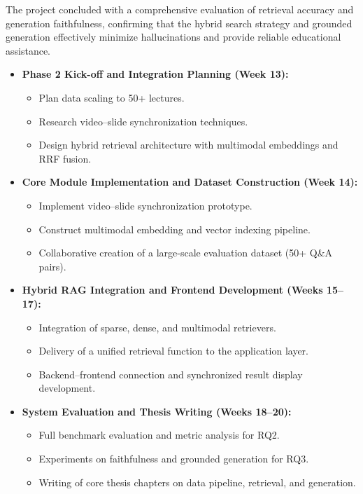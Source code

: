 The project concluded with a comprehensive evaluation of retrieval accuracy and generation faithfulness, confirming that the hybrid search strategy and grounded generation effectively minimize hallucinations and provide reliable educational assistance.

\begin{itemize}
    \item \textbf{Phase 2 Kick-off and Integration Planning (Week 13):}
    \begin{itemize}
        \item Plan data scaling to 50+ lectures.
        \item Research video--slide synchronization techniques.
        \item Design hybrid retrieval architecture with multimodal embeddings and RRF fusion.
    \end{itemize}

    \item \textbf{Core Module Implementation and Dataset Construction (Week 14):}
    \begin{itemize}
        \item Implement video--slide synchronization prototype.
        \item Construct multimodal embedding and vector indexing pipeline.
        \item Collaborative creation of a large-scale evaluation dataset (50+ Q\&A pairs).
    \end{itemize}

    \item \textbf{Hybrid RAG Integration and Frontend Development (Weeks 15--17):}
    \begin{itemize}
        \item Integration of sparse, dense, and multimodal retrievers.
        \item Delivery of a unified retrieval function to the application layer.
        \item Backend--frontend connection and synchronized result display development.
    \end{itemize}

    \item \textbf{System Evaluation and Thesis Writing (Weeks 18--20):}
    \begin{itemize}
        \item Full benchmark evaluation and metric analysis for RQ2.
        \item Experiments on faithfulness and grounded generation for RQ3.
        \item Writing of core thesis chapters on data pipeline, retrieval, and generation.
    \end{itemize}


\end{itemize}
